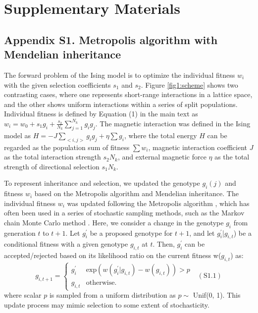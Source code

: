 \documentclass[12pt,]{article}
\newcommand{\beginsupplement}{%
        \setcounter{table}{0}
        \renewcommand{\thetable}{S\arabic{table}}%
        \setcounter{figure}{0}
        \renewcommand{\thefigure}{S\arabic{figure}}%
     }
\begin{document}
\clearpage

\section*{Supplementary Materials}
\beginsupplement

\medskip

\subsection*{Appendix S1. Metropolis algorithm with Mendelian inheritance}
The forward problem of the Ising model is to optimize the individual fitness $w_i$ with the given selection coefficients $s_1$ and $s_2$. Figure \ref{fig1:scheme} shows two contrasting cases, where one represents short-range interactions in a lattice space, and the other shows uniform interactions within a series of split populations. Individual fitness is defined by Equation (1) in the main text as $w_i = w_0 + s_1 g_i + \frac{s_2}{N_k}\sum^{N_{k}}_{j=1}{g_ig_j}$. The magnetic interaction was defined in the Ising model as $H = -J\sum_{<i,j>}{g_ig_j} + \eta\sum{g_i}$, where the total energy $H$ can be regarded as the population sum of fitness $\sum{w_i}$, magnetic interaction coefficient $J$ as the total interaction strength $s_2N_k$, and external magnetic force $\eta$ as the total strength of directional selection $s_1N_k$.

To represent inheritance and selection, we updated the genotype $g_i(j)$ and fitness $w_i$ based on the Metropolis algorithm and Mendelian inheritance. The individual fitness $w_i$ was updated following the Metropolis algorithm \citep{metropolis1953equation}, which has often been used in a series of stochastic sampling methods, such as the Markov chain Monte Carlo method \citep{bishop2006_11}. Here, we consider a change in the genotype $g_i$ from generation $t$ to $t+1$. Let $g^\prime_i$ be a proposed genotype for $t+1$, and let $g^\prime_i$|$g_{i,t}$) be a conditional fitness with a given genotype $g_{i,t}$ at $t$. Then, $g^\prime_i$ can be accepted/rejected based on its likelihood ratio on the current fitness w($g_{i,t}$) as:
\[
  g_{i,t+1} = \begin{cases}
    g_i^\prime & \mathrm{exp}(w(g^\prime_i|g_{i,t}) - w(g_{i,t})) > p \\
    g_{i,t} & \mathrm{otherwise.}
  \end{cases}~~~(\mathrm{S1.1})
\]
where scalar $p$ is sampled from a uniform distribution as $p \sim$ Unif(0, 1). This update process may mimic selection to some extent of stochasticity.
\end{document}
